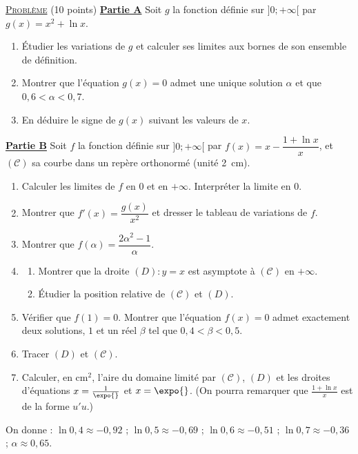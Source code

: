 \noindent \underline{\textsc{Probl\`eme}} (10 points) \newline
\underline{\textbf{Partie A}} \newline
Soit $g$ la fonction d\'efinie sur $]0 ; +\infty[$ par $g(x) = x^2 + \ln x$.
\begin{enumerate}
      \item \'Etudier les variations de $g$ et calculer ses limites aux bornes de son ensemble de d\'efinition.
      \item Montrer que l'\'equation $g(x) = 0$ admet une unique solution $\alpha$ et que $0{,}6 < \alpha < 0{,}7$.
      \item En d\'eduire le signe de $g(x)$ suivant les valeurs de $x$.
\end{enumerate}
\underline{\textbf{Partie B}} \newline
Soit $f$ la fonction d\'efinie sur $]0 ; +\infty[$ par $f(x) = x - \dfrac{1 + \ln x}{x}$, et $(\mathscr{C})$ sa courbe
dans un rep\`ere orthonorm\'e (unit\'e 2~cm).
\begin{enumerate}
      \item Calculer les limites de $f$ en $0$ et en $+\infty$. Interpr\'eter la limite en $0$.
      \item Montrer que $f'(x) = \dfrac{g(x)}{x^2}$ et dresser le tableau de variations de $f$.
      \item Montrer que $f(\alpha) = \dfrac{2\alpha^2 - 1}{\alpha}$.
      \item \begin{enumerate}
            \item Montrer que la droite $(D) : y = x$ est asymptote \`a $(\mathscr{C})$ en $+\infty$.
            \item \'Etudier la position relative de $(\mathscr{C})$ et $(D)$.
            \end{enumerate}
      \item V\'erifier que $f(1) = 0$. Montrer que l'\'equation $f(x) = 0$ admet exactement deux solutions, $1$ et un r\'eel
            $\beta$ tel que $0{,}4 < \beta < 0{,}5$.
      \item Tracer $(D)$ et $(\mathscr{C})$.
      \item Calculer, en cm$^2$, l'aire du domaine limit\'e par $(\mathscr{C})$, $(D)$ et les droites d'\'equations
            $x = \frac{1}{\expo{}}$ et $x = \expo{}$. (On pourra remarquer que $\frac{1 + \ln x}{x}$ est de la forme $u'u$.)
\end{enumerate}
\begin{center}
On donne : $\ln 0{,}4 \approx -0{,}92$ ; $\ln 0{,}5 \approx -0{,}69$ ; $\ln 0{,}6 \approx -0{,}51$ ; $\ln 0{,}7 \approx -0{,}36$ ; $\alpha \approx 0{,}65$.
\end{center}

